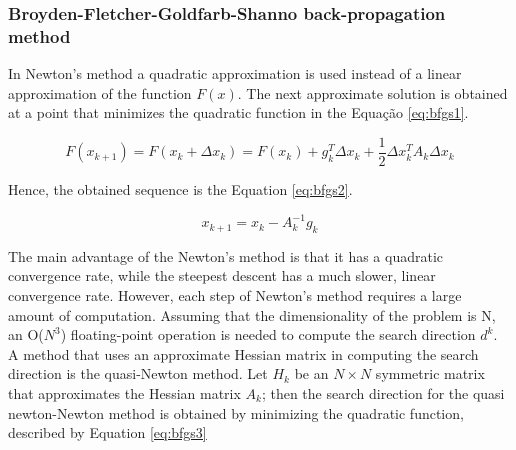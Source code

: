 \subsubsection{Broyden-Fletcher-Goldfarb-Shanno back-propagation method}

In Newton's method a quadratic approximation is used instead of a linear approximation of the function $F(x)$. The next approximate solution is obtained at a point that minimizes the quadratic function in the Equação \ref{eq:bfgs1}.

\begin{equation}
\label{eq:bfgs1}
F(x_{k+1}) = F(x_k + \Delta x_k) = F(x_{k})+ g^T_k\Delta x_k + \frac{1}{2}\Delta x^T_k A_k \Delta x_k
\end{equation}

Hence, the obtained sequence is the Equation \ref{eq:bfgs2}.

\begin{equation}
\label{eq:bfgs2}
x_{k+1} = x_k - A^{-1}_k g_k
\end{equation}

The main advantage of the Newton's method is that it has a quadratic convergence rate, while the steepest descent has a much slower, linear convergence rate. However, each step of Newton's method requires a large amount of computation. Assuming that the dimensionality of the problem is N, an O($N^3$) floating-point operation is needed to compute the search direction $d^k$. A method that uses an approximate Hessian matrix in computing the search direction is the quasi-Newton method. Let $H_k$ be an $N \times N$ symmetric matrix that approximates the Hessian matrix $A_k$; then the search direction for the quasi newton-Newton method is obtained by minimizing the quadratic function, described by Equation \ref{eq:bfgs3} \cite{saini2002artificial}

